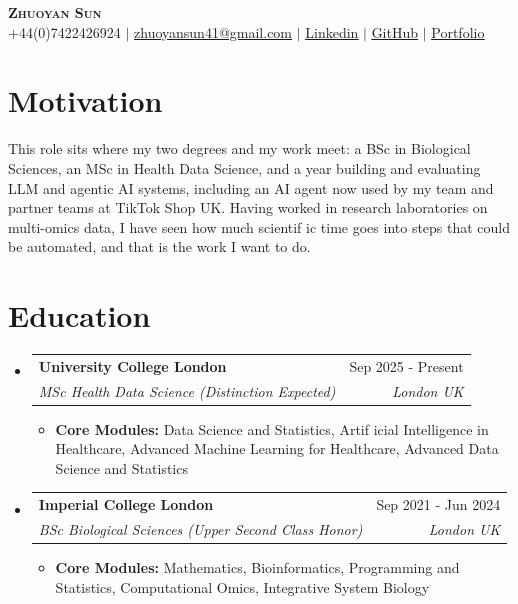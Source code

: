 \documentclass[letterpaper,11pt]{article}
\makeatletter
\newcommand{\resumeItem}[1]{
  \item\small{
    {#1 \vspace{-2pt}}
  }
}
\newcommand{\resumeSubheading}[4]{
  \vspace{-2pt}\item
    \begin{tabular*}{0.97\textwidth}[t]{l@{\extracolsep{\fill}}r}
      \textbf{#1} & #2 \\
      \textit{\small#3} & \textit{\small #4} \\
    \end{tabular*}\vspace{-7pt}
}
\newcommand{\resumeSubHeadingListStart}{\begin{itemize}[leftmargin=0.15in, label={}]}
\newcommand{\resumeSubHeadingListEnd}{\end{itemize}}
\newcommand{\resumeItemListStart}{\begin{itemize}}
\newcommand{\resumeItemListEnd}{\end{itemize}\vspace{-5pt}}
\makeatother
\begin{document}
\begin{center}
    \textbf{\Huge \scshape Zhuoyan Sun} \\ \vspace{3pt}
\small
+44(0)7422426924 $|$
\href{mailto:zhuoyansun41@gmail.com}{\underline{zhuoyansun41@gmail.com}} $|$
\href{https://www.linkedin.com/in/zhuoyan-jennifer-sun-8b6558297}{\underline{Linkedin}} $|$
\href{https://github.com/jennifersun09b}{\underline{GitHub}} $|$
\href{https://jennifersun09b.github.io/portfolio/}{\underline{Portfolio}}
\end{center}


\section{\textbf{Motivation}}
\vspace{-4pt}
{\small This role sits where my two degrees and my work meet: a BSc in Biological Sciences, an MSc in Health Data Science, and a year building and evaluating LLM and agentic AI systems, including an AI agent now used by my team and partner teams at TikTok Shop UK. Having worked in research laboratories on multi-omics data, I have seen how much scientif\kern0pt ic time goes into steps that could be automated, and that is the work I want to do.}
\vspace{2pt}
\section{\textbf{Education}}
  \resumeSubHeadingListStart
    \resumeSubheading
      {University College London}{Sep 2025 - Present}
      {MSc Health Data Science \textit{(Distinction Expected)}}{London \textbf{\textbar{}} UK}
          \resumeItemListStart
            \resumeItem{\textbf{Core Modules:} Data Science and Statistics, Artif\kern0pt icial Intelligence in Healthcare, Advanced Machine Learning for Healthcare, Advanced Data Science and Statistics}
        \resumeItemListEnd

     \resumeSubheading
      {Imperial College London}{Sep 2021 - Jun 2024}
      {BSc Biological Sciences \textit{(Upper Second Class Honor)}}{London \textbf{\textbar{}} UK}
          \resumeItemListStart
            \resumeItem{\textbf{Core Modules:} Mathematics, Bioinformatics, Programming and Statistics, Computational Omics, Integrative System Biology}
        \resumeItemListEnd

  \resumeSubHeadingListEnd
\end{document}
